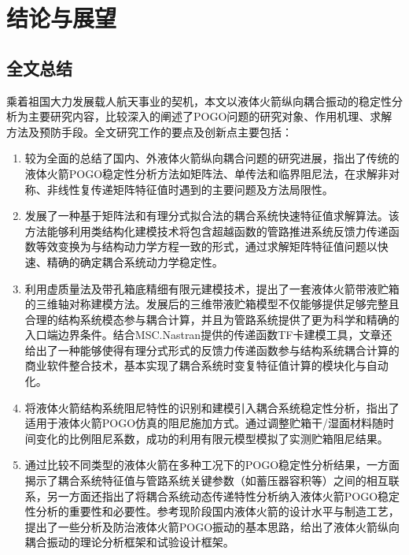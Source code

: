 
\chapter{结论与展望}

\section{全文总结}
乘着祖国大力发展载人航天事业的契机，本文以液体火箭纵向耦合振动的稳定性分析为主要研究内容，比较深入的阐述了POGO问题的研究对象、作用机理、求解方法及预防手段。全文研究工作的要点及创新点主要包括：
\begin{enumerate}[leftmargin=0pt, align=parleft, itemindent=2\parindent, labelsep=0pt, label=\roman*).]
	\item 较为全面的总结了国内、外液体火箭纵向耦合问题的研究进展，指出了传统的液体火箭POGO稳定性分析方法如矩阵法、单传法和临界阻尼法，在求解非对称、非线性复传递矩阵特征值时遇到的主要问题及方法局限性。
	\item 发展了一种基于矩阵法和有理分式拟合法的耦合系统快速特征值求解算法。该方法能够利用类结构化建模技术将包含超越函数的管路推进系统反馈力传递函数等效变换为与结构动力学方程一致的形式，通过求解矩阵特征值问题以快速、精确的确定耦合系统动力学稳定性。
	\item 利用虚质量法及带孔箱底精细有限元建模技术，提出了一套液体火箭带液贮箱的三维轴对称建模方法。发展后的三维带液贮箱模型不仅能够提供足够完整且合理的结构系统模态参与耦合计算，并且为管路系统提供了更为科学和精确的入口端边界条件。结合MSC.Nastran提供的传递函数TF卡建模工具，文章还给出了一种能够使得有理分式形式的反馈力传递函数参与结构系统耦合计算的商业软件整合技术，基本实现了耦合系统时变复特征值计算的模块化与自动化。
	\item 将液体火箭结构系统阻尼特性的识别和建模引入耦合系统稳定性分析，指出了适用于液体火箭POGO仿真的阻尼施加方式。通过调整贮箱干/湿面材料随时间变化的比例阻尼系数，成功的利用有限元模型模拟了实测贮箱阻尼结果。
	\item 通过比较不同类型的液体火箭在多种工况下的POGO稳定性分析结果，一方面揭示了耦合系统特征值与管路系统关键参数（如蓄压器容积等）之间的相互联系，另一方面还指出了将耦合系统动态传递特性分析纳入液体火箭POGO稳定性分析的重要性和必要性。参考现阶段国内液体火箭的设计水平与制造工艺，提出了一些分析及防治液体火箭POGO振动的基本思路，给出了液体火箭纵向耦合振动的理论分析框架和试验设计框架。
\end{enumerate}

